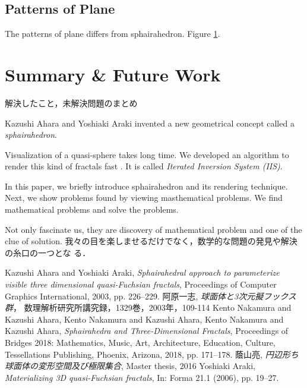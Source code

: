 \documentclass[dvipdfmx]{interact}
\theoremstyle{plain}%
\theoremstyle{definition}
\theoremstyle{remark}
\theoremstyle{problemstyle}
\begin{document}
\subsection{Patterns of Plane}
The patterns of plane differs from sphairahedron.
Figure \ref{}.

\section{Summary \& Future Work}
解決したこと，未解決問題のまとめ

Kazushi Ahara and Yoshiaki Araki invented a new geometrical concept
called a \textit{sphairahedron}.

Visualization of a quasi-sphere takes long time.
We developed an algorithm to render this kind of fractals fast
\cite{bridges2018}.
 It is called \textit{Iterated Inversion System (IIS)}.

In this paper, we briefly introduce sphairahedron and its rendering
technique.
Next, we show problems found by viewing masthematical problems.
We find mathematical problems and solve the problems.

Not only fascinate us, they are discovery of mathematical problem
and one of the clue of solution.
我々の目を楽しませるだけでなく，数学的な問題の発見や解決の糸口の一つとな
る．

\begin{thebibliography}{99}
        Kazushi Ahara and Yoshiaki Araki,
        \emph{Sphairahedral approach to parameterize visible three
        dimensional quasi-Fuchsian fractals},
        Proceedings of Computer Graphics International, 2003,
        pp. 226--229.
        阿原一志, \emph{球面体と3次元擬フックス群}，
        数理解析研究所講究録，1329巻，2003年，109-114
        Kento Nakamura and Kazushi Ahara,
        Kento Nakamura and Kazushi Ahara,
        Kento Nakamura and Kazushi Ahara,
        \emph{Sphairahedra and Three-Dimensional Fractals}, 
        Proceedings of Bridges 2018: Mathematics, Music, Art, Architecture,
        Education, Culture, Tessellations Publishing,
        Phoenix, Arizona, 2018, pp. 171--178.
        蔭山亮, 
        \emph{円辺形ち球面体の変形空間及び極限集合},
        Master thesis, 2016
        Yoshiaki Araki,
        \emph{Materializing 3D quasi-Fuchsian fractals},
        In: Forma 21.1 (2006), pp. 19–27.
\end{thebibliography}
\end{document}
